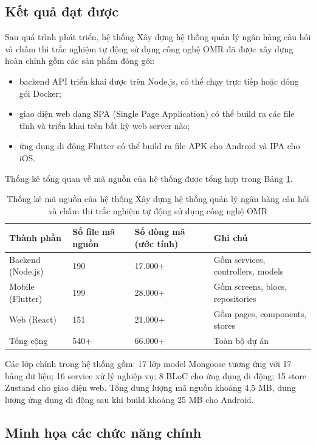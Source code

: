 ﻿\documentclass[../DoAn.tex]{subfiles}
\begin{document}
\subsection{Kết quả đạt được}
\label{subsection:4.3.2}

Sau quá trình phát triển, hệ thống Xây dựng hệ thống quản lý ngân hàng câu hỏi và chấm thi trắc nghiệm tự động sử dụng công nghệ OMR đã được xây dựng hoàn chỉnh gồm các sản phẩm đóng gói:
\begin{itemize}
    \item backend API triển khai được trên Node.js, có thể chạy trực tiếp hoặc đóng gói Docker;
    \item giao diện web dạng SPA (Single Page Application) có thể build ra các file tĩnh và triển khai trên bất kỳ web server nào;
    \item ứng dụng di động Flutter có thể build ra file APK cho Android và IPA cho iOS.
\end{itemize}

Thống kê tổng quan về mã nguồn của hệ thống được tổng hợp trong Bảng \ref{table:4.2}.

\begin{table}[H]
\centering
\begin{tabular}{|p{3.5cm}|p{3cm}|p{3cm}|p{4cm}|}
\hline
\textbf{Thành phần} & \textbf{Số file mã nguồn} & \textbf{Số dòng mã (ước tính)} & \textbf{Ghi chú} \\ \hline
Backend (Node.js) & 190 & 17.000+ & Gồm services, controllers, models \\ \hline
Mobile (Flutter) & 199 & 28.000+ & Gồm screens, blocs, repositories \\ \hline
Web (React) & 151 & 21.000+ & Gồm pages, components, stores \\ \hline
Tổng cộng & 540+ & 66.000+ & Toàn bộ dự án \\ \hline
\end{tabular}
\caption{Thống kê mã nguồn của hệ thống Xây dựng hệ thống quản lý ngân hàng câu hỏi và chấm thi trắc nghiệm tự động sử dụng công nghệ OMR}
\label{table:4.2}
\end{table}

Các lớp chính trong hệ thống gồm: 17 lớp model Mongoose tương ứng với 17 bảng dữ liệu; 16 service xử lý nghiệp vụ; 8 BLoC cho ứng dụng di động; 15 store Zustand cho giao diện web. Tổng dung lượng mã nguồn khoảng 4,5 MB, dung lượng ứng dụng di động sau khi build khoảng 25 MB cho Android.

\subsection{Minh họa các chức năng chính}
\label{subsection:4.3.3}
\end{document}

